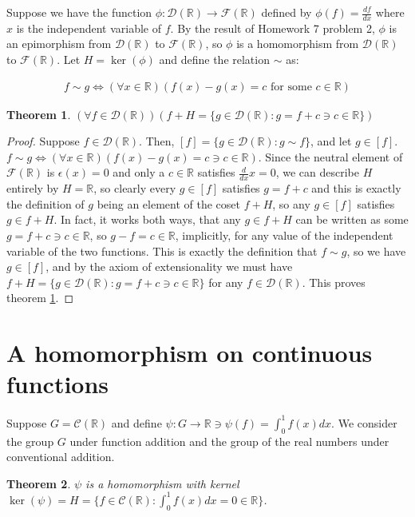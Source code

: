 \documentclass[12pt]{article}
\newcommand{\reals}{\mathbb{R}}
\newcommand{\freals}{\mathcal{F}(\reals)}
\newcommand{\dreals}{\mathcal{D}(\reals)}
\newcommand{\creals}{\mathcal{C}(\reals)}
\newtheorem{thm}{Theorem}
\begin{document}
Suppose we have
the function $\phi: \dreals \to \freals$
defined by $\phi(f) = \frac{df}{dx}$
where $x$ is the independent variable of $f$.
By the result of Homework 7 problem 2,
$\phi$ is an epimorphism from $\dreals$ to $\freals$,
so $\phi$ is a homomorphism from $\dreals$ to $\freals$.
Let $H = \ker(\phi)$ and define the relation $\sim$ as:

\begin{align} \label{sim}
	f \sim g \iff (\forall x \in \reals)(f(x) - g(x) = c \text{ for some } c \in \reals)
\end{align}

\begin{thm} \label{thm8}
	$(\forall f \in \dreals)(f + H = \{g \in \dreals: g = f + c \ni c \in \reals\})$
\end{thm}

\begin{proof}
	Suppose $f \in \dreals$.
	Then, $[f] = \{g \in \dreals: g \sim f \}$, and let $g \in [f]$.
	$f \sim g \iff (\forall x \in \reals)(f(x) - g(x) = c \ni c \in \reals)$.
	Since the neutral element of $\freals$ is $\epsilon(x) = 0$ and
	only a $c \in \reals$ satisfies $\frac{d}{dx} x = 0$,
	we can describe $H$ entirely by $H = \reals$,
	so clearly every $g \in [f]$ satisfies $g = f + c$
	and this is exactly the definition of $g$ being
	an element of the coset $f + H$,
	so any $g \in [f]$ satisfies $g \in f + H$.
	In fact, it works both ways, that any
	$g \in f + H$ can be written as some $g = f + c \ni c \in \reals$,
	so $g - f = c \in \reals$, implicitly, for any value of
	the independent variable of the two functions.
	This is exactly the definition that $f \sim g$,
	so we have $g \in [f]$,
	and by the axiom of extensionality
	we must have $f + H = \{g \in \dreals: g = f + c \ni c \in \reals\}$
	for any $f \in \dreals$. This proves theorem \ref{thm8}.
\end{proof}

\section{A homomorphism on continuous functions}

Suppose $G = \creals$ and define $\psi: G \to \reals \ni \psi(f) = \int_0^1 f(x)dx$.
We consider the group $G$ under function addition
and the group of the real numbers under conventional addition.

\begin{thm} \label{thm9}
	$\psi$ is a homomorphism with kernel $\ker(\psi) = H = \{f \in \creals: \int_0^1 f(x)dx = 0 \in \reals\}$.
\end{thm}
\end{document}
